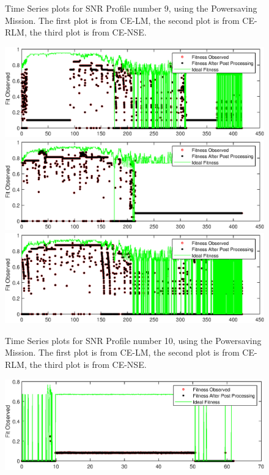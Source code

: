 \begin{appendices}
\begin{figure}[ht!]
\caption{Time Series plots for SNR Profile number 9, using the Powersaving Mission. The first plot is from CE-LM, the second plot is from CE-RLM, the third plot is from CE-NSE.}
\end{figure}
\begin{figure}[ht!]
\includegraphics{figures/c_sim_timeSeries/Fitness_timeSeries_LM_10.eps}
\includegraphics{figures/c_sim_timeSeries/Fitness_timeSeries_RLM_10.eps}
\includegraphics{figures/c_sim_timeSeries/Fitness_timeSeries_NSE_10.eps}
\caption{Time Series plots for SNR Profile number 10, using the Powersaving Mission. The first plot is from CE-LM, the second plot is from CE-RLM, the third plot is from CE-NSE.}
\end{figure}
\begin{figure}[ht!]
\includegraphics{figures/c_sim_timeSeries/Fitness_timeSeries_LM_11.eps}

\end{figure}
\end{appendices}
